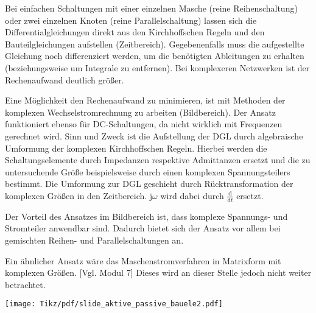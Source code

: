 \begin{frame}
{    %
    Bei einfachen Schaltungen mit einer einzelnen Masche (reine Reihenschaltung) oder zwei einzelnen Knoten (reine Parallelschaltung)
    lassen sich die Differentialgleichungen direkt aus den Kirchhoffschen Regeln und den Bauteilgleichungen aufstellen (Zeitbereich).
    Gegebenenfalls muss die aufgestellte Gleichung noch differenziert werden, um die benötigten Ableitungen zu erhalten
    (beziehungsweise um Integrale zu entfernen). 
    Bei komplexeren Netzwerken ist der Rechenaufwand deutlich größer. 

    Eine Möglichkeit den Rechenaufwand zu minimieren, ist mit Methoden der komplexen Wechselstromrechnung zu arbeiten (Bildbereich). 
    Der Ansatz funktioniert ebenso für DC-Schaltungen, da nicht wirklich mit Frequenzen gerechnet wird. 
    Sinn und Zweck ist die Aufstellung der DGL durch algebraische Umformung der komplexen Kirchhoffschen Regeln.
    Hierbei werden die Schaltungselemente durch Impedanzen respektive Admittanzen ersetzt und die zu untersuchende Größe
    beispielsweise durch einen komplexen Spannungsteilers bestimmt. 
    Die Umformung zur DGL geschieht durch Rücktransformation der komplexen Größen in den Zeitbereich.
    $\mathrm{j}\omega$ wird dabei durch $\frac{\mathrm{d}}{\mathrm{d} t}$ ersetzt. 
    
    Der Vorteil des Ansatzes im Bildbereich ist, dass komplexe Spannungs- und Stromteiler anwendbar sind. 
    Dadurch bietet sich der Ansatz vor allem bei gemischten Reihen- und Parallelschaltungen an.  

    Ein ähnlicher Ansatz wäre das Maschenstromverfahren in Matrixform mit komplexen Größen. [Vgl. Modul 7] 
    Dieses wird an dieser Stelle jedoch nicht weiter betrachtet.

}%
\b{%
    \texttt{[image: Tikz/pdf/slide\_aktive\_passive\_bauele2.pdf]}
}%
\end{frame}

